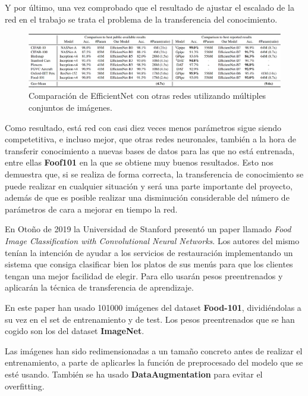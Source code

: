 Y por último, una vez comprobado que el resultado de ajustar el escalado de la red en el trabajo se trata el problema de la transferencia del conocimiento.

\begin{figure}[H]
  \centering
  \includegraphics[width=1\linewidth]{Imagenes/cmp-efficient.png}
  \caption{Comparación de EfficientNet con otras redes utilizando múltiples conjuntos de imágenes.}
  \label{fig:param-precision}
\end{figure}

Como resultado, está red con casi diez veces menos parámetros sigue siendo competetitiva, e incluso mejor, que otras redes neuronales, también a la hora de transferir conocimiento a nuevas bases de datos para las que no está entrenada, entre ellas \textbf{Foof101} en la que se obtiene muy buenos resultados. Esto nos demuestra que, si se realiza de forma correcta, la transferencia de conocimiento se puede realizar en cualquier situación y será una parte importante del proyecto, además de que es posible realizar una disminución considerable del número de parámetros de cara a mejorar en tiempo la red.


\newpage

En Otoño de 2019 la Universidad de Stanford presentó un paper llamado \textit{Food Image Classification with Convolutional Neural Networks}. Los autores del mismo tenían la intención de ayudar a los servicios de restauración implementando un sistema que consiga clasificar bien los platos de sus menús para que los clientes tengan una mejor facilidad de elegir. Para ello usarán pesos preentrenados y aplicarán la técnica de transferencia de aprendizaje.

\vspace{3 mm}

En este paper han usado 101000 imágenes del dataset \textbf{Food-101}, dividiéndolas a su vez en el set de entrenamiento y de test. Los pesos preentrenados que se han cogido son los del dataset \textbf{ImageNet}.

\vspace{3 mm}

Las imágenes han sido redimensionadas a un tamaño concreto antes de realizar el entrenamiento, a parte de aplicarles la función de preprocesado del modelo que se esté usando. También se ha usado \textbf{DataAugmentation} para evitar el overfitting.

